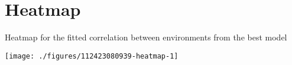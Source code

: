 \documentclass[a4paper,11pt]{article}\usepackage[]{graphicx}\usepackage[]{xcolor}
\newenvironment{knitrout}{}{} %
\begin{document}
\section{Heatmap}
Heatmap for the fitted correlation between environments from the best model
\begin{knitrout}
\color{fgcolor}

\texttt{[image: ./figures/112423080939-heatmap-1]} \hfill{}


\end{knitrout}

\end{document}
